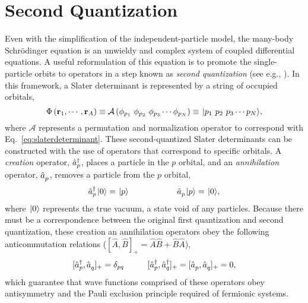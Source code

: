 \documentclass[thesis.tex]{subfiles}
\begin{document}
\section{Second Quantization}
Even with the simplification of the independent-particle model, the many-body Schr\"{o}dinger equation is an unwieldy and complex system of coupled differential equations.  A useful reformulation of this equation is to promote the single-particle orbits to operators in a step known as \textit{second quantization} (see e.g., \cite{SHAVITT2009,FETTER2003043536}).  In this framework, a Slater determinant is represented by a string of occupied orbitals,
\begin{equation}
  \Phi\left(\mathbf{r}_{1},\cdots,\mathbf{r}_{A}\right) \equiv \mathcal{A}\left(\phi_{p_{1}}\ \phi_{p_{2}}\ \phi_{p_{3}} \cdots \phi_{p_{N}}\right) \equiv \hspace{1pt}\lvert p_{1}\ p_{2}\ p_{3} \cdots p_{N} \rangle,
\end{equation}
where $\mathcal{A}$ represents a permutation and normalization operator to correspond with Eq.\ \eqref{eq:slaterdeterminant}.  These second-quantized Slater determinants can be constructed with the use of operators that correspond to specific orbitals.  A \textit{creation} operator, $\mathop{\hat{a}^{\dagger}_{p}}$, places a particle in the $p$ orbital, and an \textit{annihilation} operator, $\mathop{\hat{a}^{}_{p}}$, removes a particle from the $p$ orbital,
\begin{equation}
  \mathop{\hat{a}^{\dagger}_{p}}\hspace{1pt}\lvert 0 \rangle = \hspace{1pt}\lvert p \rangle \hspace{2cm} \mathop{\hat{a}^{}_{p}}\hspace{1pt}\lvert p \rangle = \hspace{1pt}\lvert 0 \rangle,
\end{equation}
where $\hspace{1pt}\lvert 0 \rangle$ represents the true vacuum, a state void of any particles.  Because there must be a correspondence between the original first quantization and second quantization, these creation an annihilation operators obey the following anticommutation relations ($[ \hat{A},\hat{B} ]_{+} = \hat{A}\hat{B} + \hat{B}\hat{A}$),
\begin{equation} \label{eq:anticommutation}
  [ \mathop{\hat{a}^{\dagger}_{p}},\mathop{\hat{a}^{}_{q}} ]_{+} = \delta_{pq} \hspace{1cm} [ \mathop{\hat{a}^{\dagger}_{p}},\mathop{\hat{a}^{\dagger}_{q}} ]_{+} = [ \mathop{\hat{a}^{}_{p}},\mathop{\hat{a}^{}_{q}} ]_{+} = 0,
\end{equation}
which guarantee that wave functions comprised of these operators obey antisymmetry and the Pauli exclusion principle required of fermionic systems.
\end{document}
